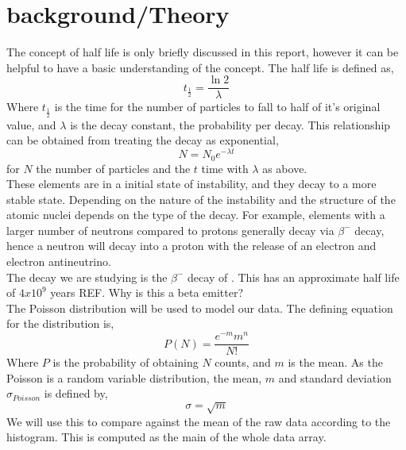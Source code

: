\documentclass[11pt]{article}
\begin{document}
    \section{background/Theory}
    The concept of half life is only briefly discussed in this report, however it can be helpful to have a basic understanding of the concept. The half life is defined as,
    \begin{equation}
        t_{\frac{1}{2}} = \frac{\ln{2}}{\lambda}
    \end{equation}
    Where $ t_{\frac{1}{2}}$ is the time for the number of particles to fall to half of it's original value, and $\lambda$ is the decay constant, the probability per decay. This relationship can be obtained from treating the decay as exponential, 
    $$N = N_0 e^{-\lambda t}$$
    for $N$ the number of particles and the $t$ time with $\lambda$ as above. 
   \\
   These elements are in a initial state of instability, and they decay to a more stable state. Depending on the nature of the instability and the structure of the atomic nuclei depends on the type of the decay. For example, elements with a larger number of neutrons compared to protons generally decay via $\beta^{-}$ decay, hence a neutron will decay into a proton with the release of an electron and electron antineutrino. 
   \\
   The decay we are studying is the $\beta^{-}$ decay of . This has an approximate half life of $4 x 10^9$ years REF. Why is this a beta emitter?
   \\
    The Poisson distribution will be used to model our data. The defining equation for the distribution is, 
    \begin{equation}
        P(N) = \frac{e^{-m}m^{n}}{N!}
    \end{equation}
    Where $P$ is the probability of obtaining $N$ counts, and $m$ is the mean.
    As the Poisson is a random variable distribution, the mean, $m$ and standard deviation $\sigma_{Poisson}$ is defined by,
    \begin{equation}
        \sigma = \sqrt{m}
    \end{equation}
    We will use this to compare against the mean of the raw data according to the histogram. This is computed as the main of the whole data array. 
     \newline 
\end{document}
